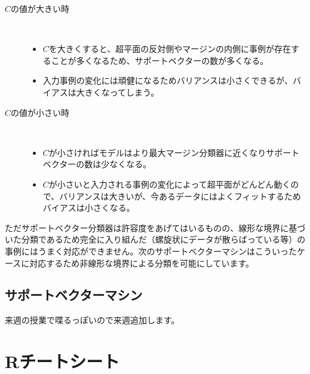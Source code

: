 \documentclass[uplatex]{jsarticle}
\begin{document}
\begin{description}
  \item[$C$の値が大きい時]\mbox{}\\
  \begin{itemize}
    \item $C$を大きくすると、超平面の反対側やマージンの内側に事例が存在することが多くなるため、サポートベクターの数が多くなる。
    \item 入力事例の変化には頑健になるためバリアンスは小さくできるが、バイアスは大きくなってしまう。
  \end{itemize}
  \item[$C$の値が小さい時]\mbox{}\\
  \begin{itemize}
    \item $C$が小さければモデルはより最大マージン分類器に近くなりサポートベクターの数は少なくなる。
    \item $C$が小さいと入力される事例の変化によって超平面がどんどん動くので、バリアンスは大きいが、今あるデータにはよくフィットするためバイアスは小さくなる。
  \end{itemize}
\end{description}

ただサポートベクター分類器は許容度をあげてはいるものの、線形な境界に基づいた分類であるため完全に入り組んだ（螺旋状にデータが散らばっている等）の事例にはうまく対応ができません。次のサポートベクターマシンはこういったケースに対応するため非線形な境界による分類を可能にしています。
\subsection{サポートベクターマシン}
来週の授業で喋るっぽいので来週追加します。

\section{Rチートシート}
\end{document}
